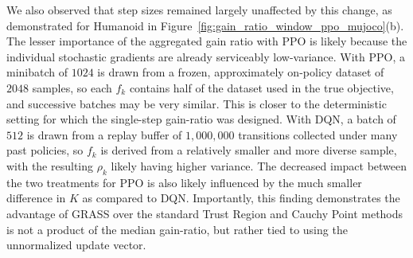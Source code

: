 We also observed that step sizes remained largely unaffected by this change, as demonstrated for Humanoid in Figure~\ref{fig:gain_ratio_window_ppo_mujoco}(b).
The lesser importance of the aggregated gain ratio with PPO is likely because the individual stochastic gradients are already serviceably low-variance. With PPO, a minibatch of $1024$ is drawn from a frozen, approximately on-policy dataset of $2048$ samples, so each $f_k$ contains half of the dataset used in the true objective, and successive batches may be very similar. This is closer to the deterministic setting for which the single-step gain-ratio was designed. With DQN, a batch of $512$ is drawn from a replay buffer of $1{,}000{,}000$ transitions collected under many past policies, so $f_k$ is derived from a relatively smaller and more diverse sample, with the resulting $\rho_k$ likely having higher variance. The decreased impact between the two treatments for PPO is also likely influenced by the much smaller difference in $K$ as compared to DQN. Importantly, this finding demonstrates the advantage of GRASS over the standard Trust Region and Cauchy Point methods is not a product of the median gain-ratio, but rather tied to using the unnormalized update vector. 


